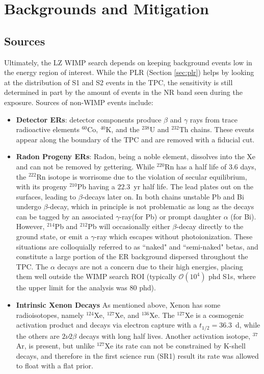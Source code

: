 \section{Backgrounds and Mitigation}
\subsection{Sources}

Ultimately, the LZ WIMP search depends on keeping background events low in the energy region of interest.
While the PLR (Section \ref{sec:plr}) helps by looking at the distribution of S1 and S2 events in the TPC, the sensitivity is still determined in part by the amount of events in the NR band seen during the exposure.
Sources of non-WIMP events include\cite{aalbers_background_2022}:

\begin{itemize}
    \item \textbf{Detector ERs}: detector components produce $\beta$ and $\gamma$ rays from trace radioactive elements $^{60}$Co, $^{40}$K, and the $^{238}$U and $^{232}$Th chains. 
    These events appear along the boundary of the TPC and are removed with a fiducial cut.
    \item \textbf{Radon Progeny ERs}: Radon, being a noble element, dissolves into the Xe and can not be removed by gettering.
    While $^{220}$Rn has a half life of 3.6 days, the $^{222}$Rn isotope is worrisome due to the violation of secular equilibrium, with its progeny $^{210}$Pb having a $22.3$~yr half life\cite{bruenner_radon_2021}. 
    The lead plates out on the surfaces, leading to $\beta$-decays later on.
    In both chains unstable Pb and Bi undergo $\beta$-decay, which in principle is not problematic as long as the decays can be tagged by an associated $\gamma$-ray(for Pb) or prompt daughter $\alpha$ (for Bi).
    However, $^{214}$Pb and $^{212}$Pb will occasionally either $\beta$-decay directly to the ground state, or emit a $\gamma$-ray which escapes without photoionization.
    These situations are colloquially referred to as ``naked" and ``semi-naked" betas, and constitute a large portion of the ER background dispersed throughout the TPC.
    The $\alpha$ decays are not a concern due to their high energies, placing them well outside the WIMP search ROI (typically $\mathcal{O}(10^4)$ phd S1s, where the upper limit for the analysis was 80 phd).
    \item \textbf{Intrinsic Xenon Decays}
    As mentioned above, Xenon has some radioisotopes, namely $^{124}$Xe, $^{127}$Xe, and $^{136}$Xe. 
    The $^{127}$Xe is a cosmogenic activation product and decays via electron capture with a $t_{1/2}=36.3$~d, while the others are $2\nu2\beta$ decays with long half lives.
    Another activation isotope, $^{37}$Ar, is present, but unlike $^{127}$Xe its rate can not be constrained by K-shell decays, and therefore in the first science run (SR1) result its rate was allowed to float with a flat prior\cite{aalbers_first_2022}.
    

\end{itemize}
